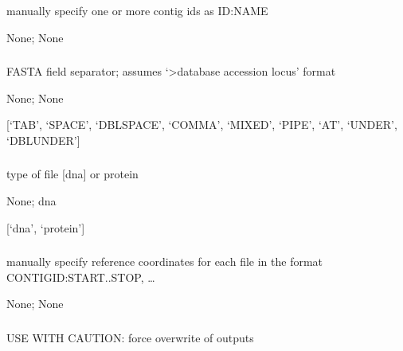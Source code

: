 \documentclass[letterpaper,11pt,english]{sphinxmanual}
\begin{document}
\subsubsection{}
\label{\detokenize{prog_desc:contig-ids-contigids}}
 manually specify one or more contig ids as ID:NAME

 None;  None


\subsubsection{}
\label{\detokenize{prog_desc:field-sep-fieldsep}}
 FASTA field separator; assumes ‘\textgreater{}database accession locus’ format

 None;  None

 {[}‘TAB’, ‘SPACE’, ‘DBLSPACE’, ‘COMMA’, ‘MIXED’, ‘PIPE’, ‘AT’, ‘UNDER’, ‘DBLUNDER’{]}


\subsubsection{}
\label{\detokenize{prog_desc:flavor}}
 type of file {[}dna{]} or protein

 None;  dna

 {[}‘dna’, ‘protein’{]}


\subsubsection{}
\label{\detokenize{prog_desc:manual-coord-manualcoord}}
 manually specify reference coordinates for each file in the format CONTIGID:START..STOP, …

 None;  None


\subsubsection{}
\label{\detokenize{prog_desc:overwrite}}
 USE WITH CAUTION: force overwrite of outputs
\end{document}
